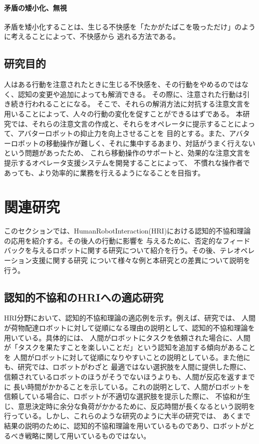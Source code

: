 \documentclass[11pt,a4j]{jreport}
\begin{document}
\subsubsection{矛盾の矮小化、無視}
矛盾を矮小化することは、生じる不快感を「たかがたばこを吸っただけ」のように考えることによって、不快感から
逃れる方法である。

\section{研究目的}
人はある行動を注意されたときに生じる不快感を、その行動をやめるのではなく、認知の変更や追加によっても解消できる。
その際に、注意された行動は引き続き行われることになる。
そこで、それらの解消方法に対抗する注意文言を用いることによって、人々の行動の変化を促すことができるはずである。
本研究では、それらの注意文言の作成と、それらをオペレータに提示することによって、アバターロボットの抑止力を向上させることを
目的とする。また、アバターロボットの移動操作が難しく、それに集中するあまり、対話がうまく行えないという問題があったため、
これら移動操作のサポートと、効果的な注意文言を提示するオペレータ支援システムを開発することによって、
不慣れな操作者であっても、より効率的に業務を行えるようになることを目指す。



\chapter{関連研究}
このセクションでは、HumanRobotInteraction(HRI)における認知的不協和理論の応用を紹介する。その後人の行動に影響を
与えるために、否定的なフィードバックを与えるロボットに関する研究について紹介を行う。その後、テレオペレーション支援に関する研究
について様々な例と本研究との差異について説明を行う。
\section{認知的不協和のHRIへの適応研究}
HRI分野において、認知的不協和理論の適応例を示す。例えば、研究\cite{washburn2022exploring}では、
人間が荷物配達ロボットに対して従順になる理由の説明として、認知的不協和理論を用いている。具体的には、
人間がロボットにタスクを依頼された場合に、人間が「タスクを果たすことを楽しいことだ」という認知を追加する傾向があることを
人間がロボットに対して従順になりやすいことの説明としている。また他にも、研究\cite{herse2018you}では、ロボットがわざと
最適ではない選択肢を人間に提供した際に、信頼されているロボットのほうがそうでないほうよりも、人間が反応を返すまでに
長い時間がかかることを示している。これの説明として、人間がロボットを信頼している場合に、ロボットが不適切な選択肢を提示した際に、
不協和が生じ、意思決定時に余分な負荷がかかるために、反応時間が長くなるという説明を行っている。しかし、これらのような研究のように大半の研究では、
あくまで結果の説明のために、認知的不協和理論を用いているものであり、ロボットがとるべき戦略に関して用いているものではない。
\end{document}
